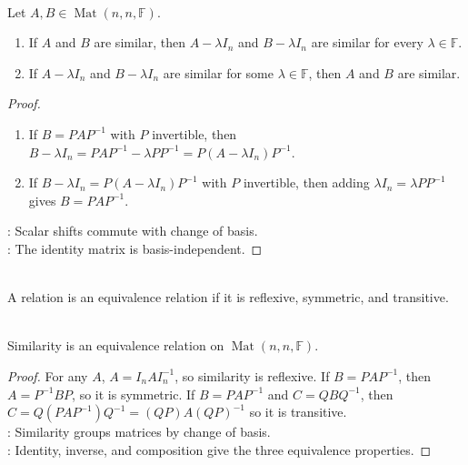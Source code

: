 \begin{theorem} \label{thm:similarity-preserves-scalar-shifts} \\
Let $A,B\in\operatorname{Mat}(n,n,\mathbb{F})$.
\begin{enumerate}[label=(\roman*)]
\setlength{\itemsep}{0pt}
\item If $A$ and $B$ are similar, then $A-\lambda I_n$ and $B-\lambda I_n$ are similar for every $\lambda\in\mathbb{F}$.
\item If $A-\lambda I_n$ and $B-\lambda I_n$ are similar for some $\lambda\in\mathbb{F}$, then $A$ and $B$ are similar.
\end{enumerate}
\begin{proof}
\begin{enumerate}[label=(\roman*)]
\setlength{\itemsep}{0pt}
\item If $B=PAP^{-1}$ with $P$ invertible, then $B-\lambda I_n=PAP^{-1}-\lambda PP^{-1}=P(A-\lambda I_n)P^{-1}$.
\item If $B-\lambda I_n=P(A-\lambda I_n)P^{-1}$ with $P$ invertible, then adding $\lambda I_n=\lambda PP^{-1}$ gives $B=PAP^{-1}$.
\end{enumerate}
: Scalar shifts commute with change of basis.\\
: The identity matrix is basis-independent.
\end{proof}
\end{theorem}

\begin{definition} \\
A relation is an equivalence relation if it is reflexive, symmetric, and transitive.
\end{definition}

\begin{proposition} \label{prop:similarity-equivalence-relation} \\
Similarity is an equivalence relation on $\operatorname{Mat}(n,n,\mathbb{F})$.
\begin{proof}
For any $A$, $A=I_nAI_n^{-1}$, so similarity is reflexive. If $B=PAP^{-1}$, then $A=P^{-1}BP$, so it is symmetric. If $B=PAP^{-1}$ and $C=QBQ^{-1}$, then $C=Q(PAP^{-1})Q^{-1}=(QP)A(QP)^{-1}$ so it is transitive.\\
: Similarity groups matrices by change of basis.\\
: Identity, inverse, and composition give the three equivalence properties.
\end{proof}
\end{proposition}

